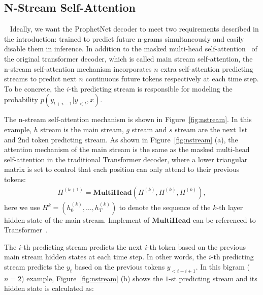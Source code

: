 \documentclass[11pt,a4paper]{article}
\begin{document}
\subsection{N-Stream Self-Attention}~\label{sec:m2}
Ideally, we want the ProphetNet decoder to meet two requirements described in the introduction: trained to predict future n-grams simultaneously and easily disable them in inference.
In addition to the masked multi-head self-attention~\cite{vaswani2017attention} of the original transformer decoder, which is called main stream self-attention, the n-stream self-attention mechanism incorporates $n$ extra self-attention predicting streams to predict next $n$ continuous future tokens respectively at each time step.
To be concrete, the $i$-th predicting stream is responsible for modeling the probability $p(y_{t+i-1} | y_{<t}, x)$.

The n-stream self-attention mechanism is shown in Figure~\ref{fig:nstream}. In this example, $h$ stream is the main stream, $g$ stream and $s$ stream are the next 1st and 2nd token predicting stream. As shown in Figure~\ref{fig:nstream} (a), the attention mechanism of the main stream is the same as the masked multi-head self-attention in the traditional Transformer decoder, where a lower triangular matrix is set to control that each position can only attend to their previous tokens:
\begin{align}
    H^{(k+1)} = \textbf{MultiHead}(H^{(k)}, H^{(k)}, H^{(k)}),
\end{align}
here we use $H^{k}= (h^{(k)}_0, \dots, h^{(k)}_T)$ to denote the sequence of the $k$-th layer hidden state of the main stream. Implement of $\textbf{MultiHead}$ can be referenced to  Transformer~\cite{vaswani2017attention}.

The $i$-th predicting stream predicts the next $i$-th token based on the previous main stream hidden states at each time step.
In other words, the $i$-th predicting stream predicts the $y_t$ based on the previous tokens $y_{<t-i+1}$.  
In this  bigram ($n=2$) example, Figure~\ref{fig:nstream} (b) shows the  $1$-st predicting stream and its hidden state is calculated as:
\end{document}
